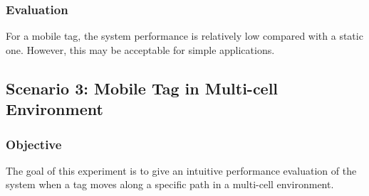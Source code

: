 \documentclass[\main/main.tex]{subfiles}
\begin{document}
\subsubsection{Evaluation}

For a mobile tag, the system performance is relatively low compared with a static one. However, this may be acceptable for simple applications.


\subsection{Scenario 3: Mobile Tag in Multi-cell Environment}

\subsubsection{Objective}
The goal of this experiment is to give an intuitive performance evaluation of the system when a tag moves along a specific path in a multi-cell environment.
\end{document}
